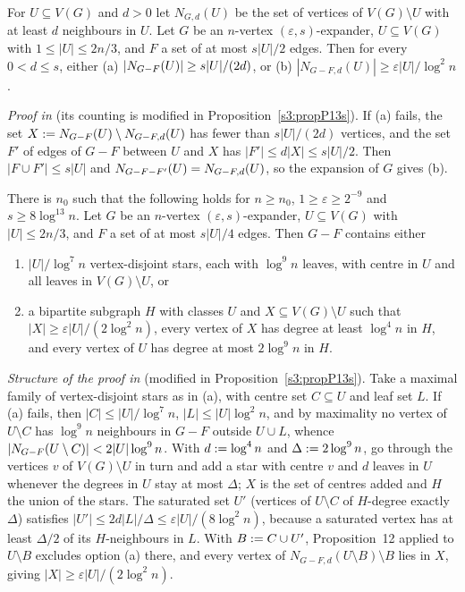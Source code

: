 \begin{citedresult}[{\cite[Proposition~12]{BM}}]\label{s1:citProp12}
For $U\subseteq V(G)$ and $d>0$ let $N_{G,d}(U)$ be the set of vertices of
$V(G)\setminus U$ with at least $d$ neighbours in $U$. Let $G$ be an $n$-vertex
$(\varepsilon,s)$-expander, $U\subseteq V(G)$ with $1\le|U|\le2n/3$, and $F$ a set
of at most $s|U|/2$ edges. Then for every $0<d\le s$, either (a)
$|N_{G-F}(U)|\ge s|U|/(2d)$, or (b) $|N_{G-F,d}(U)|\ge\varepsilon|U|/\log^2n$.

\emph{Proof in \cite{BM}} (its counting is modified in
Proposition~\ref{s3:propP13s}). If (a) fails, the set
$X\mathrel{:=}N_{G-F}(U)\setminus N_{G-F,d}(U)$ has fewer than $s|U|/(2d)$
vertices, and the set $F'$ of edges of $G-F$ between $U$ and $X$ has
$|F'|\le d|X|\le s|U|/2$. Then $|F\cup F'|\le s|U|$ and
$N_{G-F-F'}(U)=N_{G-F,d}(U)$, so the expansion of $G$ gives
(b).
\end{citedresult}

\begin{citedresult}[{\cite[Proposition~13]{BM}}]\label{s1:citProp13}
There is $n_0$ such that the following holds for $n\ge n_0$,
$1\ge\varepsilon\ge2^{-9}$ and $s\ge8\log^{13}n$. Let $G$ be an $n$-vertex
$(\varepsilon,s)$-expander, $U\subseteq V(G)$ with $|U|\le2n/3$, and $F$ a set of
at most $s|U|/4$ edges. Then $G-F$ contains either
\begin{enumerate}
\item[(a)] $|U|/\log^7n$ vertex-disjoint stars, each with $\log^9n$ leaves, with
centre in $U$ and all leaves in $V(G)\setminus U$, or
\item[(b)] a bipartite subgraph $H$ with classes $U$ and $X\subseteq
V(G)\setminus U$ such that $|X|\ge\varepsilon|U|/(2\log^2n)$, every vertex of
$X$ has degree at least $\log^4n$ in $H$, and every vertex of $U$ has degree at
most $2\log^9n$ in $H$.
\end{enumerate}
\emph{Structure of the proof in \cite{BM}} (modified in
Proposition~\ref{s3:propP13s}). Take a maximal family of vertex-disjoint stars as
in (a), with centre set $C\subseteq U$ and leaf set $L$. If (a) fails, then
$|C|\le|U|/\log^7n$, $|L|\le|U|\log^2n$, and by maximality no vertex of
$U\setminus C$ has $\log^9n$ neighbours in $G-F$ outside $U\cup L$, whence
$|N_{G-F}(U\setminus C)|<2|U|\log^9n$. With $d\mathrel{:=}\log^4n$ and
$\Delta\mathrel{:=}2\log^9n$, go through the vertices $v$ of $V(G)\setminus U$ in turn
and add a star with centre $v$ and $d$ leaves in $U$ whenever the degrees in $U$
stay at most $\Delta$; $X$ is the set of centres added and $H$ the union of the
stars. The saturated set $U'$ (vertices of $U\setminus C$ of $H$-degree exactly
$\Delta$) satisfies $|U'|\le2d|L|/\Delta\le\varepsilon|U|/(8\log^2n)$, because a
saturated vertex has at least $\Delta/2$ of its $H$-neighbours in $L$. With
$B\mathrel{:=} C\cup U'$, Proposition~12 applied to $U\setminus B$ excludes option (a)
there, and every vertex of $N_{G-F,d}(U\setminus B)\setminus B$ lies in $X$,
giving $|X|\ge\varepsilon|U|/(2\log^2n)$.
\end{citedresult}

